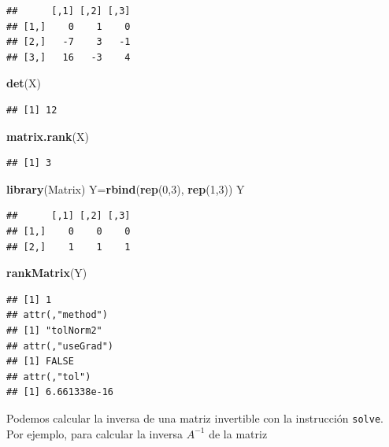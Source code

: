 \documentclass[]{book}
\newenvironment{Shaded}{\begin{snugshade}}{\end{snugshade}}
\newcommand{\DecValTok}[1]{\textcolor[rgb]{0.00,0.00,0.81}{#1}}
\newcommand{\KeywordTok}[1]{\textcolor[rgb]{0.13,0.29,0.53}{\textbf{#1}}}
\newcommand{\NormalTok}[1]{#1}
\theoremstyle{definition}
\theoremstyle{definition}
\theoremstyle{definition}
\theoremstyle{remark}
\begin{document}
\begin{verbatim}
##      [,1] [,2] [,3]
## [1,]    0    1    0
## [2,]   -7    3   -1
## [3,]   16   -3    4
\end{verbatim}

\begin{Shaded}
\begin{Highlighting}[]
\KeywordTok{det}\NormalTok{(X)}
\end{Highlighting}
\end{Shaded}

\begin{verbatim}
## [1] 12
\end{verbatim}

\begin{Shaded}
\begin{Highlighting}[]
\KeywordTok{matrix.rank}\NormalTok{(X)}
\end{Highlighting}
\end{Shaded}

\begin{verbatim}
## [1] 3
\end{verbatim}

\begin{Shaded}
\begin{Highlighting}[]
\KeywordTok{library}\NormalTok{(Matrix)}
\NormalTok{Y=}\KeywordTok{rbind}\NormalTok{(}\KeywordTok{rep}\NormalTok{(}\DecValTok{0}\NormalTok{,}\DecValTok{3}\NormalTok{), }\KeywordTok{rep}\NormalTok{(}\DecValTok{1}\NormalTok{,}\DecValTok{3}\NormalTok{))}
\NormalTok{Y}
\end{Highlighting}
\end{Shaded}

\begin{verbatim}
##      [,1] [,2] [,3]
## [1,]    0    0    0
## [2,]    1    1    1
\end{verbatim}

\begin{Shaded}
\begin{Highlighting}[]
\KeywordTok{rankMatrix}\NormalTok{(Y)}
\end{Highlighting}
\end{Shaded}

\begin{verbatim}
## [1] 1
## attr(,"method")
## [1] "tolNorm2"
## attr(,"useGrad")
## [1] FALSE
## attr(,"tol")
## [1] 6.661338e-16
\end{verbatim}

Podemos calcular la inversa de una matriz invertible con la instrucción \texttt{solve}. Por ejemplo, para calcular la inversa \(A^{-1}\) de la matriz
\end{document}
